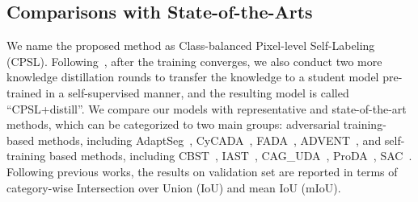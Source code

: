 \documentclass[10pt,twocolumn,letterpaper]{article}
\begin{document}
	\subsection{Comparisons with State-of-the-Arts}
	\label{sec4.2}
	We name the proposed method as Class-balanced Pixel-level Self-Labeling (CPSL). Following~\cite{zhang2021prototypical}, after the training converges, we also conduct two more knowledge distillation rounds to transfer the knowledge to a student model pre-trained in a self-supervised manner, and the resulting model is called “CPSL+distill”. 
We compare our models with representative and state-of-the-art methods, which can be categorized to two main groups: adversarial training-based methods, including AdaptSeg~\cite{tsai2018learning}, CyCADA~\cite{hoffman2017cycada}, FADA~\cite{wang2020classes}, ADVENT~\cite{vu2019advent}, and self-training based methods, including CBST~\cite{zou2018domain}, IAST~\cite{mei2020instance}, CAG\_UDA~\cite{zhang2019category}, ProDA~\cite{zhang2021prototypical}, SAC~\cite{araslanov2021self}. Following previous works, the results on validation set are reported in terms of category-wise Intersection over Union (IoU) and mean IoU (mIoU).
	
\end{document}
